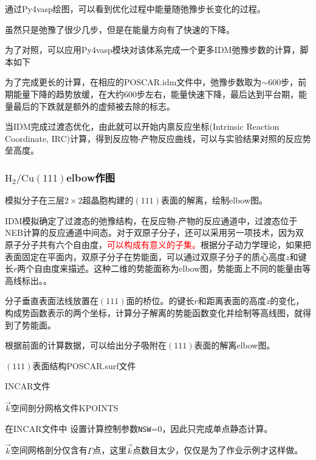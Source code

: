 通过\textrm{Py4vasp}绘图，可以看到优化过程中能量随弛豫步长变化的过程。

虽然只是弛豫了很少几步，但是在能量方向有了快速的下降。

为了对照，可以应用\textrm{Py4vasp}模块对该体系完成一个更多\textrm{IDM}弛豫步数的计算，脚本如下

为了完成更长的计算，在相应的\textrm{POSCAR.idm}文件中，弛豫步数取为$\sim600$步，前期能量下降的趋势放缓，在大约600步左右，能量快速下降，最后达到平台期，能量最后的下跌就是额外的虚频被去除的标志。

当\textrm{IDM}完成过渡态优化，由此就可以开始内禀反应坐标\textrm{(Intrinsic Reaction Coordinate, IRC)}计算，得到反应物-产物反应曲线，可以与实验结果对照的反应势垒高度。

\subsubsection{$\mathrm{H}_2/\mathrm{Cu}(111)$\textrm{elbow}作图}

模拟分子在三层$2\times2$超晶胞构建的$(111)$表面的解离，绘制\textrm{elbow}图。

\textrm{IDM}模拟确定了过渡态的弛豫结构，在反应物-产物的反应通道中，过渡态位于\textrm{NEB}计算的反应通道中间态。对于双原子分子，还可以采用另一项技术，因为双原子分子共有六个自由度，\textcolor{red}{可以构成有意义的子集。}根据分子动力学理论，如果把表面固定在平面内，双原子分子在势能面，可以通过双原子分子的质心高度$z$和键长$r$两个自由度来描述。这种二维的势能面称为\textrm{elbow}图，势能面上不同的能量由等高线标出。。

分子垂直表面法线放置在$(111)$面的桥位。的键长$r$和距离表面的高度$z$的变化，构成势函数表示的两个坐标，计算分子解离的势能函数变化并绘制等高线图，就得到了势能面。

根据前面的计算数据，可以给出分子吸附在$(111)$表面的解离\textrm{elbow}图。

$(111)$表面结构\textrm{POSCAR.surf}文件

\textrm{INCAR}文件

$\vec k$空间剖分网格文件\textrm{KPOINTS}

在\textrm{INCAR}文件中%
设置计算控制参数\texttt{NSW}=0，因此只完成单点静态计算。

$\vec k$空间网格剖分仅含有$\Gamma$点，这里$\vec k$点数目太少，仅仅是为了作业示例才这样做。

